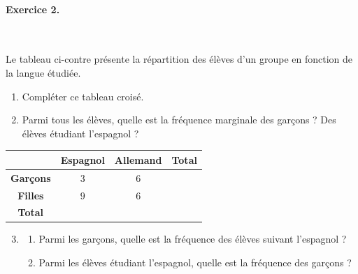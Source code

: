 \documentclass[11pt]{article}
\begin{document}
\paragraph{Exercice 2.}~\\
\begin{minipage}{.4\textwidth}
  Le tableau ci-contre présente la répartition des élèves d'un groupe en
  fonction de la langue étudiée.
  \begin{enumerate}
    \item Compléter ce tableau croisé.
    \item Parmi tous les élèves, quelle est la fréquence marginale des garçons ?
      Des élèves étudiant l'espagnol ?
  \end{enumerate}
\end{minipage}
\begin{minipage}{.6\textwidth}
\begin{center}
\renewcommand{\arraystretch}{2}
\begin{tabular}{|c|c|c|c|}
  \cline{2-4}
  \multicolumn{1}{c|}{} & \textbf{Espagnol} & \textbf{Allemand} &
  \textbf{Total} \\
  \hline
  \textbf{Garçons} & $3$ & $6$ & \\
  \hline
  \textbf{Filles} & $9$ & $6$ & \\
  \hline
  \textbf{Total} & & & \\
  \hline
\end{tabular}
\end{center}
\end{minipage}
\begin{enumerate}
    \setcounter{enumi}{2}
    \item \begin{enumerate}
        \item Parmi les garçons, quelle est la fréquence des élèves suivant
          l'espagnol ?
        \item Parmi les élèves étudiant l'espagnol, quelle est la fréquence des
          garçons ?
    \end{enumerate}
\end{enumerate}
\end{document}
